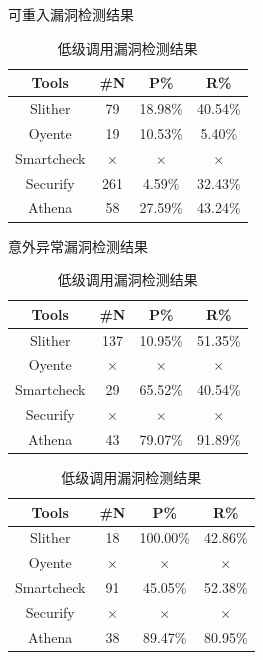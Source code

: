 \begin{table}[htbp]
  \centering
  \begin{minipage}[t]{0.48\textwidth}
  \caption{可重入漏洞检测结果}
    \begin{tabular}{cccc}
    \toprule
    Tools & \#N & P\% & R\% \\
    \midrule
    Slither & 79    & 18.98\%  & 40.54\% \\
    Oyente & 19  & 10.53\%     & 5.40\% \\
    Smartcheck  & $\times$     & $\times$  & $\times$  \\
    Securify &  261    & 4.59\%  & 32.43\% \\
    Athena & 58   & 27.59\%     & 43.24\% \\
    \bottomrule
    \end{tabular}%
  \label{tab:eval_reentrancy}%
  \end{minipage}
  \begin{minipage}[t]{0.48\textwidth}
    \caption{意外异常漏洞检测结果}
    \begin{tabular}{cccc}
    \toprule
    Tools & \#N & P\% & R\% \\
    \midrule
    Slither  & 137  & 10.95\%   & 51.35\% \\
    Oyente  & $\times$ & $\times$  & $\times$ \\
    Smartcheck  & 29  & 65.52\%   & 40.54\% \\
    Securify  & $\times$  & $\times$  & $\times$ \\
    Athena & 43   & 79.07\%     & 91.89\% \\
    \bottomrule
    \end{tabular}%
  \label{tab:eval_revert}%
  \end{minipage}
  \begin{minipage}[t]{0.48\textwidth}
    \caption{低级调用漏洞检测结果}
    \begin{tabular}{cccc}
    \toprule
    Tools & \#N & P\% & R\% \\
    \midrule
    Slither & 18   & 100.00\%     & 42.86\% \\
    Oyente  & $\times$ & $\times$ & $\times$ \\
    Smartcheck  & 91     & 45.05\%     & 52.38\% \\
    Securify & $\times$ & $\times$ & $\times$ \\
    Athena &  38  & 89.47\%    & 80.95\% \\
    \bottomrule
    \end{tabular}%

\end{minipage}
\end{table}
